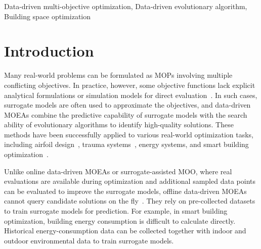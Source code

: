\documentclass[conference]{IEEEtran}
\begin{document}
\begin{abstract}
Many real-world Multi-objective Optimization Problems (MOPs) do not have explicit mathematical formulations of their objective functions. Data-driven multi-objective evolutionary algorithms (MOEAs) address this limitation by using surrogate models to approximate objective values and evolutionary algorithms as optimizers. As it is often difficult to obtain real objective values, the effectiveness of this type of approach is still unclear. This paper conducts an in-depth study of the existing offline data-driven MOEAs, including seven classic and eight uncertainty-aware approaches, on eight real-world benchmark problems. The results show that TabPFN+NSGA-II, GPR-Mat\'ern+NSGA-II, and GPR-Mat\'ern+NSGA-II+DR achieve the top-three overall performance by balancing predictive accuracy (MSE), surrogate-real evaluation consistency, and optimization performance (HV). These three methods are then applied to a flexible building space optimization problem. Although the real objective values of the obtained solutions are unknown, these methods still reveal some similar patterns in room configurations.



\end{abstract}

\begin{IEEEkeywords}
Data-driven multi-objective optimization, Data-driven evolutionary algorithm, Building space optimization
\end{IEEEkeywords}

\section{Introduction}
Many real-world problems can be formulated as \gls{MOPs} involving multiple conflicting objectives. In practice, however, some objective functions lack explicit analytical formulations or simulation models for direct evaluation~\cite{ddeo_rvea}. In such cases, surrogate models are often used to approximate the objectives, and data-driven \gls{MOEAs} combine the predictive capability of surrogate models with the search ability of evolutionary algorithms to identify high-quality solutions. These methods have been successfully applied to various real-world optimization tasks, including airfoil design~\cite{ddeo_2}, trauma systems~\cite{ddeo_1}, energy systems, and smart building optimization~\cite{building_opt, building_opt2}.

Unlike online data-driven \gls{MOEAs} or surrogate-assisted \gls{MOO}, where real evaluations are available during optimization and additional sampled data points can be evaluated to improve the surrogate models, offline data-driven \gls{MOEAs} cannot query candidate solutions on the fly~\cite{ddeo_ibea,ddeo_rvea}. They rely on pre-collected datasets to train surrogate models for prediction. For example, in smart building optimization, building energy consumption is difficult to calculate directly. Historical energy-consumption data can be collected together with indoor and outdoor environmental data to train surrogate models.
\end{document}

